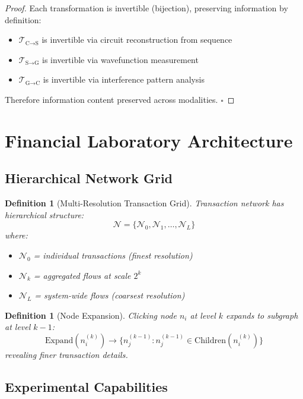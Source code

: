 \documentclass[12pt]{article}
\newtheorem{definition}[theorem]{Definition}
\begin{document}
\begin{proof}
Each transformation is invertible (bijection), preserving information by definition:
\begin{itemize}
    \item $\mathcal{T}_{\text{C→S}}$ is invertible via circuit reconstruction from sequence
    \item $\mathcal{T}_{\text{S→G}}$ is invertible via wavefunction measurement
    \item $\mathcal{T}_{\text{G→C}}$ is invertible via interference pattern analysis
\end{itemize}
Therefore information content preserved across modalities.
$\square$
\end{proof}


\section{Financial Laboratory Architecture}

\subsection{Hierarchical Network Grid}

\begin{definition}[Multi-Resolution Transaction Grid]
Transaction network has hierarchical structure:
$$
\mathcal{N} = \{\mathcal{N}_0, \mathcal{N}_1, \ldots, \mathcal{N}_L\}
$$
where:
\begin{itemize}
    \item $\mathcal{N}_0$ = individual transactions (finest resolution)
    \item $\mathcal{N}_k$ = aggregated flows at scale $2^k$
    \item $\mathcal{N}_L$ = system-wide flows (coarsest resolution)
\end{itemize}
\end{definition}

\begin{definition}[Node Expansion]
Clicking node $n_i$ at level $k$ expands to subgraph at level $k-1$:
$$
\text{Expand}(n_i^{(k)}) \to \{n_j^{(k-1)} : n_j^{(k-1)} \in \text{Children}(n_i^{(k)})\}
$$
revealing finer transaction details.
\end{definition}

\subsection{Experimental Capabilities}
\end{document}
